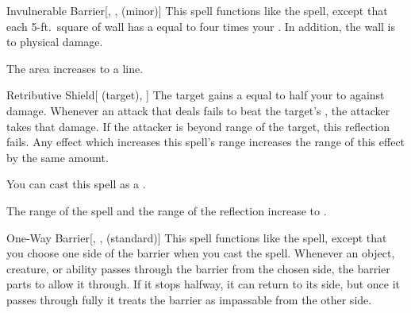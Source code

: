 \lowercase{\hypertarget{spell:Invulnerable Barrier}{}}\label{spell:Invulnerable Barrier}
\begin{freeability}[Rank 6]{\hypertarget{spell:Invulnerable Barrier}{Invulnerable Barrier}}[, ,  (minor)]
\targetrule
This spell functions like the  spell, except that each 5-ft.\ square of wall has a  equal to four times your .
In addition, the wall is  to physical damage.

 The area increases to a \arealarge line.
\end{freeability}
\vspace{0.25em}



\lowercase{\hypertarget{spell:Retributive Shield}{}}\label{spell:Retributive Shield}
\begin{attuneability}[Rank 6]{\hypertarget{spell:Retributive Shield}{Retributive Shield}}[ (target), ]
The target gains a  equal to half your  to  against  damage.
Whenever an attack that deals  fails to beat the target's , the attacker takes that damage.
If the attacker is beyond \rngclose range of the target, this reflection fails.
Any effect which increases this spell's range increases the range of this effect by the same amount.

You can cast this spell as a .

\rankline
{} The range of the spell and the range of the reflection increase to \rngmed.
\end{attuneability}
\vspace{0.25em}



\lowercase{\hypertarget{spell:One-Way Barrier}{}}\label{spell:One-Way Barrier}
\begin{freeability}[Rank 7]{\hypertarget{spell:One-Way Barrier}{One-Way Barrier}}[, ,  (standard)]
\targetrule
This spell functions like the  spell, except that you choose one side of the barrier when you cast the spell.
Whenever an object, creature, or ability passes through the barrier from the chosen side, the barrier parts to allow it through.
If it stops halfway, it can return to its side, but once it passes through fully it treats the barrier as impassable from the other side.
\end{freeability}
\vspace{0.25em}




